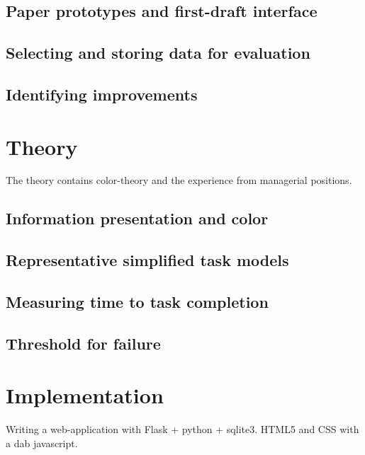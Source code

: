 \documentclass[nofilelist,dvipsnames]{cslthse-msc}
\begin{document}
      \subsection{Paper prototypes and first-draft interface}

      \subsection{Selecting and storing data for evaluation}

      \subsection{Identifying improvements}



		\section{Theory}

			The theory contains color-theory and the experience from managerial
			positions.

			\subsection{Information presentation and color}

			\subsection{Representative simplified task models}

			\subsection{Measuring time to task completion}

			\subsection{Threshold for failure}


		\section{Implementation}

			Writing a web-application with Flask + python + sqlite3.
			HTML5 and CSS with a dab javascript.
\end{document}
